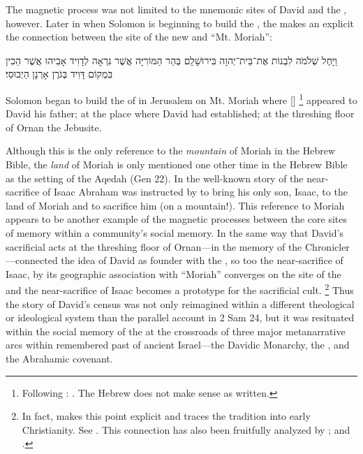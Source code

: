 The magnetic process was not limited to the mnemonic sites of David and the \temple, however. Later in \chronicles when Solomon is beginning to build the \temple, the \chronicler makes an explicit the connection between the site of the new \temple and ``Mt. Moriah'':
\begin{hebrewtext}
    וַיָּחֶל שְׁלֹמֹה לִבְנוֹת אֶת־בֵּית־יְהוָה בִּירוּשָׁלִַם בְּהַר הַמּוֹרִיָּה אֲשֶׁר נִרְאָה לְדָוִיד אָבִיהוּ אֲשֶׁר הֵכִין בִּמְקוֹם דָּוִיד בְּגֹרֶן אָרְנָן הַיְבוּסִי׃
\end{hebrewtext}
\begin{translation}
    Solomon began to build the \temple of \yahweh in Jerusalem on Mt. Moriah where [\yahweh]%
        \footnote{Following \lxx: 
        .
        The Hebrew does not make sense as written.}
    appeared to David his father;
    at the place where David had established; 
    at the threshing floor of Ornan the Jebusite.
\end{translation}
\noindent
Although this is the only reference to the \emph{mountain} of Moriah in the Hebrew Bible, the \emph{land} of Moriah is only mentioned one other time in the Hebrew Bible as the setting of the Aqedah (Gen 22). In the well-known story of the near-sacrifice of Isaac Abraham was instructed by \yahweh to bring his only son, Isaac,  to the land of Moriah and to sacrifice him (on a mountain!). This reference to Moriah appears to be another example of the magnetic processes between the core sites of memory within a community's social memory. In the same way that David's sacrificial acts at the threshing floor of Ornan---in the memory of the Chronicler---connected the idea of David as \temple founder with the \jerusalemtemple, so too the near-sacrifice of Isaac, by its geographic association with ``Moriah'' converges on the site of the \jerusalemtemple and the near-sacrifice of Isaac becomes a prototype for the sacrificial cult.%
    \footnote{In fact, \vermes makes this point explicit and traces the tradition into early Christianity. See \cite[204--211]{vermes1961}. This connection has also been fruitfully analyzed by \cite{kalimi_htr1990}; \cite[190--191]{kalimi_jnes2009} and \cite{amit_brenner-polak2009}.}
Thus the story of David's census was not only reimagined within a different theological or ideological system than the parallel account in 2 Sam 24, but it was resituated within the social memory of the \chronicler at the crossroads of three major metanarrative arcs within remembered past of ancient Israel---the Davidic Monarchy, the \jerusalemtemple, and the Abrahamic covenant.


